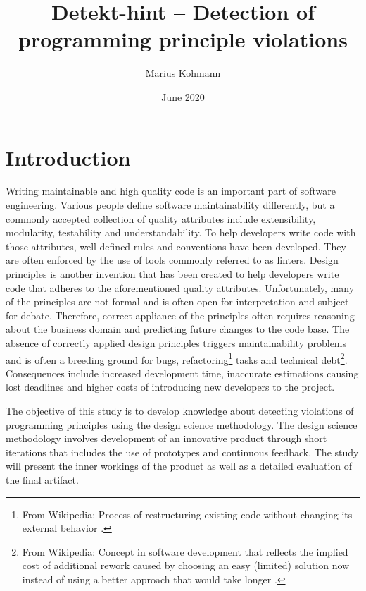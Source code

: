 \documentclass{article}
\title{Detekt-hint -- Detection of programming principle violations}
\author{Marius Kohmann}
\date{June 2020}
\begin{document}
\maketitle

\begin{abstract}
	
	
	
\end{abstract}


\clearpage
\tableofcontents
\clearpage
\section{Introduction}
Writing maintainable and high quality code is an important part of software engineering. Various people define software maintainability differently, but a commonly
accepted collection of quality attributes include extensibility, modularity, testability and understandability. To help developers write code with those attributes, well defined rules and conventions have been developed. They are often enforced by the use of tools commonly referred to as linters. Design principles is another invention that has been created to help developers write code that adheres to the aforementioned quality attributes. Unfortunately, many of the principles are not formal and is often open for interpretation and subject for debate. Therefore, correct appliance of the principles often requires reasoning about the business domain and predicting future changes to the code base. The absence of correctly applied design principles triggers maintainability problems and is often a breeding ground for bugs, refactoring\footnote{From Wikipedia: Process of restructuring existing code without changing its external behavior \cite{refactoring}.} tasks and technical debt\footnote{From Wikipedia: Concept in software development that reflects the implied cost of additional rework caused by choosing an easy (limited) solution now instead of using a better approach that would take longer \cite{technicalDebt}.}. Consequences include increased development time, inaccurate estimations causing lost deadlines and higher costs of introducing new developers to the project.

The objective of this study is to develop knowledge about detecting violations of programming principles using the design science methodology. The design science methodology involves development of an innovative product through short iterations that includes the use of prototypes and continuous feedback. The study will present the inner workings of the product as well as a detailed evaluation of the final artifact.
\end{document}
